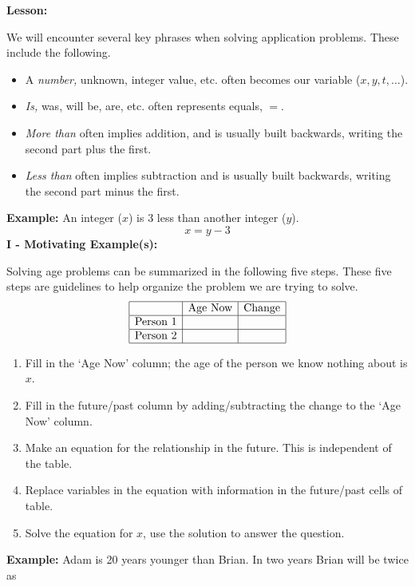 \documentclass[12pt]{article}
\theoremstyle{definition}
\begin{document}
{\bf Lesson:}
\par
We will encounter several key phrases when solving application problems.  These include the following.
\begin{itemize}
  \item A {\it number,} unknown, integer value, etc. often becomes our variable ($x,y,t,\ldots$).  
  \item {\it Is,} was, will be, are, etc. often represents equals, $=$.
  \item {\it More than} often implies addition, and is usually built backwards, writing the second part plus the first.
  \item {\it Less than} often implies subtraction and is usually built backwards, writing the second part minus the first.
\end{itemize}
{\bf Example:} An integer ($x$) is 3 less than another integer ($y$).
$$x=y-3$$
{\bf I - Motivating Example(s):}\\
\par
Solving age problems can be summarized in the following five steps. These five
steps are guidelines to help organize the problem we are trying to solve.
\[%
  \begin{array}{|c|c|c|}
    \hline
    & \mbox{Age~Now} & \mbox{Change}\\
    \hline
    \mbox{Person~1} &  & \\
    \hline
    \mbox{Person~2} &  & \\
    \hline
  \end{array} \]
\begin{enumerate}
\newpage
  \item Fill in the `Age Now' column; the age of the person we know nothing about is $x$.
  
  \item Fill in the future/past column by adding/subtracting the change to
  the `Age Now' column.
  
  \item Make an equation for the relationship in the future. This is
  independent of the table.
  
  \item Replace variables in the equation with information in the future/past cells of table.
  
  \item Solve the equation for $x$, use the solution to answer the question.
\end{enumerate}
{\bf Example:} Adam is 20 years younger than Brian. In two years Brian will be twice as
\end{document}
